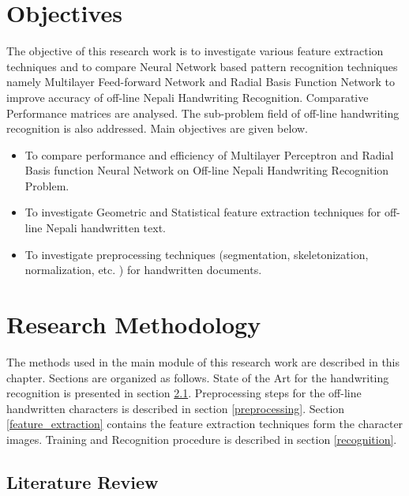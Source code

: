 \documentclass[12pt,a4paper,oneside]{article}
\numberwithin{equation}{section}
\numberwithin{algorithm}{section}
\begin{document}
	\section{Objectives}
	\label{objectives}
	The objective of this research work is to investigate various feature extraction techniques and to compare Neural Network based pattern recognition techniques namely Multilayer Feed-forward Network and Radial Basis Function Network to improve accuracy of off-line Nepali Handwriting Recognition. Comparative Performance matrices are analysed. The sub-problem field of off-line handwriting recognition is also addressed. Main objectives are given below.
	\begin{itemize}
	\item  To compare performance and efficiency of Multilayer Perceptron and Radial Basis function Neural Network on Off-line Nepali Handwriting Recognition Problem.
	\item To investigate Geometric and Statistical feature extraction techniques for off-line Nepali handwritten text.
	\item To investigate preprocessing techniques (segmentation, skeletonization, normalization, etc. ) for handwritten documents.
	\end{itemize}
	
	\section{Research Methodology}
	\label{research_methodology}
	
	The methods used in the main module of this research work are described in this chapter. Sections are organized as follows. State of the Art for the handwriting recognition is presented in section \ref{literature_review}. Preprocessing steps for the off-line handwritten characters is described in section \ref{preprocessing}. Section \ref{feature_extraction} contains the feature extraction techniques form the character images. Training and Recognition procedure is described in section \ref{recognition}.
	
	\subsection{Literature Review}
	\label{literature_review}
	
	
\end{document}
